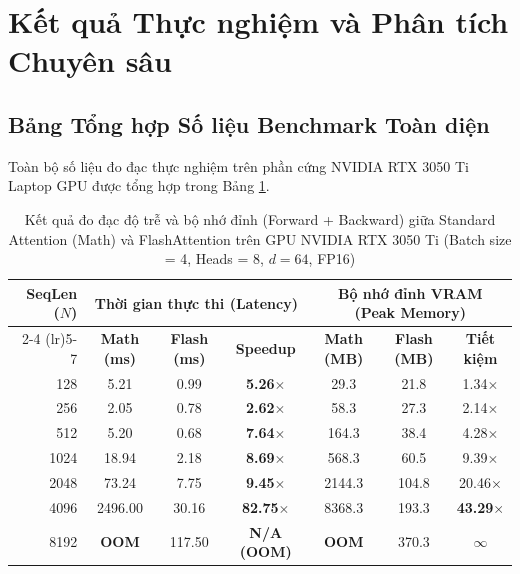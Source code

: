 \documentclass[10pt,a4paper]{article}
\begin{document}
\section{Kết quả Thực nghiệm và Phân tích Chuyên sâu}
\label{sec:results}

\subsection{Bảng Tổng hợp Số liệu Benchmark Toàn diện}
Toàn bộ số liệu đo đạc thực nghiệm trên phần cứng NVIDIA RTX 3050 Ti Laptop GPU được tổng hợp trong Bảng \ref{tab:benchmark_results}.

\begin{table}[htbp]
\centering
\caption{Kết quả đo đạc độ trễ và bộ nhớ đỉnh (Forward + Backward) giữa Standard Attention (Math) và FlashAttention trên GPU NVIDIA RTX 3050 Ti (Batch size = 4, Heads = 8, $d = 64$, FP16)}
\label{tab:benchmark_results}
\small
\setlength{\tabcolsep}{6pt}
\begin{tabular}{rcccccc}
\toprule
\multirow{2}{*}{\textbf{SeqLen ($N$)}} & \multicolumn{3}{c}{\textbf{Thời gian thực thi (Latency)}} & \multicolumn{3}{c}{\textbf{Bộ nhớ đỉnh VRAM (Peak Memory)}} \\
\cmidrule(lr){2-4} \cmidrule(lr){5-7}
 & \textbf{Math (ms)} & \textbf{Flash (ms)} & \textbf{Speedup} & \textbf{Math (MB)} & \textbf{Flash (MB)} & \textbf{Tiết kiệm} \\
\midrule
128  & 5.21    & 0.99   & \textbf{5.26$\times$}  & 29.3   & 21.8  & 1.34$\times$ \\
256  & 2.05    & 0.78   & \textbf{2.62$\times$}  & 58.3   & 27.3  & 2.14$\times$ \\
512  & 5.20    & 0.68   & \textbf{7.64$\times$}  & 164.3  & 38.4  & 4.28$\times$ \\
1024 & 18.94   & 2.18   & \textbf{8.69$\times$}  & 568.3  & 60.5  & 9.39$\times$ \\
2048 & 73.24   & 7.75   & \textbf{9.45$\times$}  & 2144.3 & 104.8 & 20.46$\times$ \\
4096 & 2496.00 & 30.16  & \textbf{82.75$\times$} & 8368.3 & 193.3 & \textbf{43.29$\times$} \\
8192 & \textbf{OOM} & 117.50 & \textbf{N/A (OOM)}     & \textbf{OOM}   & 370.3 & \textbf{$\infty$} \\
\bottomrule
\end{tabular}
\end{table}
\end{document}
